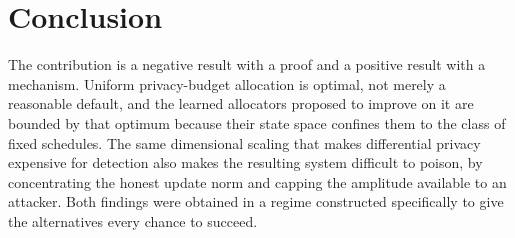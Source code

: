 \section{Conclusion}

The contribution is a negative result with a proof and a positive result with a
mechanism. Uniform privacy-budget allocation is optimal, not merely a reasonable
default, and the learned allocators proposed to improve on it are bounded by
that optimum because their state space confines them to the class of fixed
schedules. The same dimensional scaling that makes differential privacy
expensive for detection also makes the resulting system difficult to poison, by
concentrating the honest update norm and capping the amplitude available to an
attacker. Both findings were obtained in a regime constructed specifically to
give the alternatives every chance to succeed.
